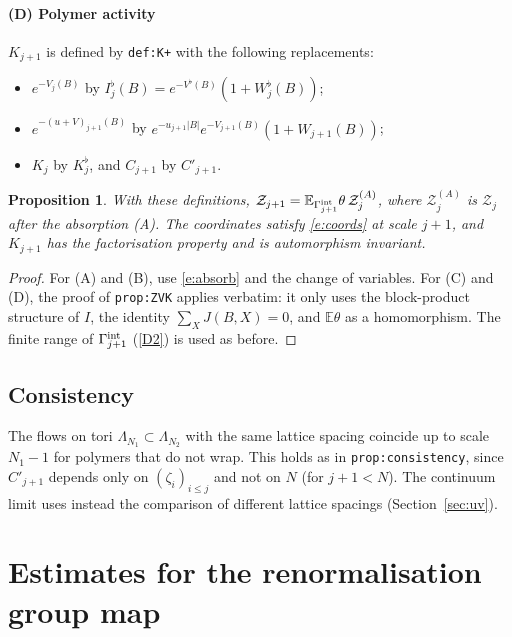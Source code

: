 \documentclass[11pt]{amsart}
\newtheorem{proposition}[theorem]{Proposition}
\theoremstyle{definition}
\theoremstyle{remark}
\numberwithin{equation}{section}
\newcommand{\E}{\mathbb{E}}
\newcommand{\cZ}{\mathcal{Z}}
\begin{document}
\paragraph{(D) Polymer activity}
$K_{j+1}$ is defined by \texttt{def:K+} with the following replacements:
\begin{itemize}
\item $e^{-V_j(B)}$ by $I^\flat_j(B)=e^{-V^\flat(B)}(1+W^\flat_j(B))$;
\item $e^{-(u+V)_{j+1}(B)}$ by $e^{-u_{j+1}|B|}e^{-V_{j+1}(B)}(1+W_{j+1}(B))$;
\item $K_j$ by $K^\flat_j$, and $C_{j+1}$ by $C'_{j+1}$.
\end{itemize}

\begin{proposition}\label{prop:ZVK}
With these definitions,
$\cZ_{j+1}=\E_{\Gamma^{\rm int}_{j+1}}\theta\,\cZ_j^{(A)}$, where $\cZ_j^{(A)}$ is $\cZ_j$ after
the absorption (A). The coordinates satisfy \eqref{e:coords} at scale $j+1$, and $K_{j+1}$ has
the factorisation property and is automorphism invariant.
\end{proposition}

\begin{proof}
For (A) and (B), use \eqref{e:absorb} and the change of variables. For (C) and (D), the proof
of \texttt{prop:ZVK} applies verbatim: it only uses the block-product structure of $I$, the
identity $\sum_XJ(B,X)=0$, and $\E\theta$ as a homomorphism. The finite range of
$\Gamma^{\rm int}_{j+1}$ (\ref{D2}) is used as before.
\end{proof}

\subsection{Consistency}
The flows on tori $\Lambda_{N_1}\subset\Lambda_{N_2}$ with the same lattice spacing coincide
up to scale $N_1-1$ for polymers that do not wrap. This holds as in \texttt{prop:consistency},
since $C'_{j+1}$ depends only on $(\zeta_i)_{i\le j}$ and not on $N$ (for $j+1<N$). The
continuum limit uses instead the comparison of different lattice spacings
(Section~\ref{sec:uv}).

\section{Estimates for the renormalisation group map}
\label{sec:est}
\end{document}
